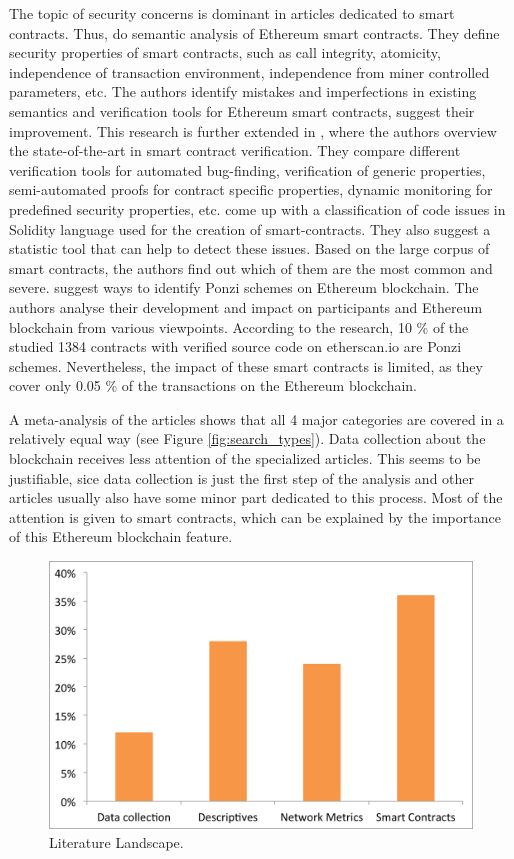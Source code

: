The topic of security concerns is dominant in articles dedicated to smart contracts. 
Thus, \cite{grishchenko2018semantic} do semantic analysis of Ethereum smart contracts. 
They define security properties of smart contracts, such as call integrity, atomicity, independence of transaction environment, independence from miner controlled parameters, etc.
The authors identify mistakes and imperfections in existing semantics and verification tools for Ethereum smart contracts, suggest their improvement.
This research is further extended in \cite{grishchenko2018foundations}, where the authors overview the state-of-the-art in smart contract verification.
They compare different verification tools for automated bug-finding, verification of generic properties, semi-automated proofs for contract specific properties, dynamic monitoring for predefined security properties, etc.
\cite{tikhomirov2018smartcheck} come up with a classification of code issues in Solidity language used for the creation of smart-contracts. 
They also suggest a statistic tool that can help to detect these issues.
Based on the large corpus of smart contracts, the authors find out which of them are the most common and severe.
\cite{bartoletti2017dissecting} suggest ways to identify Ponzi schemes on Ethereum blockchain. 
The authors analyse their development and impact on participants and Ethereum blockchain from various viewpoints. 
According to the research, 10 \% of the studied 1384 contracts with verified source code
on etherscan.io are Ponzi schemes. 
Nevertheless, the impact of these smart contracts is limited, as they cover only 0.05 \% of the transactions on the Ethereum blockchain.


A meta-analysis of the articles shows that all 4 major categories are covered in a relatively equal way (see Figure \ref{fig:search_types}).
Data collection about the blockchain receives less attention of the specialized articles.
This seems to be justifiable, sice data collection is just the first step of the analysis and other articles usually also have some minor part dedicated to this process.
Most of the attention is given to smart contracts, which can be explained by the importance of this Ethereum blockchain feature.

\begin{figure}[h]
  \centering
  \includegraphics[width=\linewidth]{figures/literature.png}
  \caption{Literature Landscape.}
  \label{fig:literature}
\end{figure}

